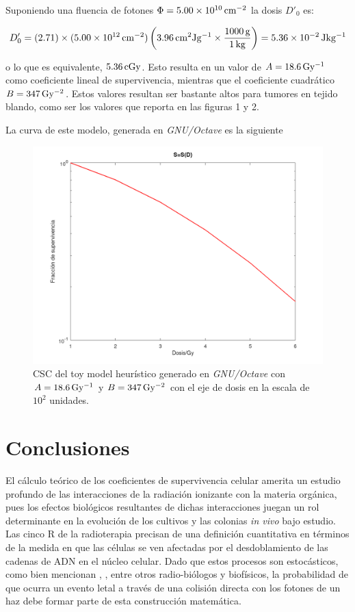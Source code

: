 \documentclass[12pt,letterpaper, oneside]{book}
\begin{document}
	Suponiendo una fluencia de fotones $\Phi=\unit[5.00\times 10^{10}]{cm^{-2}}$ la dosis $D'_0$ es:
	
	$$D'_0=(2.71)\times (\unit[5.00\times 10^{12}]{cm^{-2}})\left(\unit[3.96]{cm^2 Jg^{-1}}\times\frac{\unit[1000]{g}}{\unit[1]{kg}}\right)=\unit[5.36\times10^{-2}]{Jkg^{-1}}$$
	
	\noindent o lo que es equivalente, $\unit[5.36]{cGy}$. Esto resulta en un valor de $\unit[A=18.6]{Gy^{-1}}$ como coeficiente lineal de supervivencia, mientras que el coeficiente cuadrático $B=\unit[347]{Gy^{-2}}$. Estos valores resultan ser bastante altos para tumores en tejido blando, como ser los valores que \cite{Leeuwen.2018} reporta en las figuras 1 y 2. 
	
	La curva de este modelo, generada en \textit{GNU/Octave} es la siguiente
	
	\begin{figure}[h!]
		\centering
		\includegraphics[scale=0.30]{figuras/Csc_toymodel.png}
		\caption{CSC del toy model heurístico generado en \textit{GNU/Octave} con $A=\unit[18.6]{Gy^{-1}}$ y $B=\unit[347]{Gy^{-2}}$ con el eje de dosis en la escala de $10^2$ unidades.}\label{figura_curva_mia}
	\end{figure}  
	
	\chapter{Conclusiones}
	
	El cálculo teórico de los coeficientes de supervivencia celular amerita un estudio profundo de las interacciones de la radiación ionizante con la materia orgánica, pues los efectos biológicos resultantes de dichas interacciones juegan un rol determinante en la evolución de los cultivos y las colonias \textit{in vivo} bajo estudio. Las cinco R de la radioterapia precisan de una definición cuantitativa en términos de la medida en que las células se ven afectadas por el desdoblamiento de las cadenas de ADN en el núcleo celular. Dado que estos procesos son estocásticos, como bien mencionan \cite{Mayles.2007}, \cite{McMahon.2018}, \cite{Hall.2000} entre otros radio-biólogos y biofísicos, la probabilidad de que ocurra un evento letal a través de una colisión directa con los fotones de un haz debe formar parte de esta construcción matemática. 
	
\end{document}
